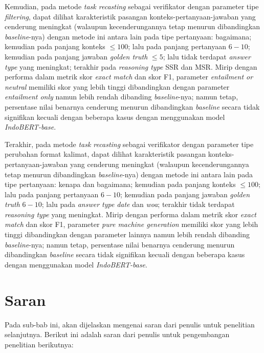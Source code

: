 \begin{enumerate}
 Kemudian, pada metode \emph{task recasting} sebagai verifikator dengan parameter tipe \emph{filtering}, dapat dilihat karakteristik pasangan konteks-pertanyaan-jawaban yang cenderung meningkat (walaupun kecenderungannya tetap menurun dibandingkan \emph{baseline}-nya) dengan metode ini antara lain pada tipe pertanyaan: bagaimana; kemudian pada panjang konteks $\leq100$; lalu pada panjang pertanyaan $6-10$; kemudian pada panjang jawaban \emph{golden truth} $\leq5$; lalu tidak terdapat \emph{answer type} yang meningkat; terakhir pada \emph{reasoning type} SSR dan MSR. Mirip dengan performa dalam metrik skor \emph{exact match} dan skor F1, parameter \emph{entailment or neutral} memiliki skor yang lebih tinggi dibandingkan dengan parameter \emph{entailment only} namun lebih rendah dibanding \emph{baseline}-nya; namun tetap, persentase nilai benarnya cenderung menurun dibandingkan \emph{baseline} secara tidak signifikan kecuali dengan beberapa kasus dengan menggunakan model \emph{IndoBERT-base}. 

 Terakhir, pada metode \emph{task recasting} sebagai verifikator dengan parameter tipe perubahan format kalimat, dapat dilihat karakteristik pasangan konteks-pertanyaan-jawaban yang cenderung meningkat (walaupun kecenderungannya tetap menurun dibandingkan \emph{baseline}-nya) dengan metode ini antara lain pada tipe pertanyaan: kenapa dan bagaimana; kemudian pada panjang konteks $\leq100$; lalu pada panjang pertanyaan $6-10$; kemudian pada panjang jawaban \emph{golden truth} $6-10$; lalu pada \emph{answer type} \emph{date} dan \emph{woa}; terakhir tidak terdapat \emph{reasoning type} yang meningkat. Mirip dengan performa dalam metrik skor \emph{exact match} dan skor F1, parameter \emph{pure machine generation} memiliki skor yang lebih tinggi dibandingkan dengan parameter lainnya namun lebih rendah dibanding \emph{baseline}-nya; namun tetap, persentase nilai benarnya cenderung menurun dibandingkan \emph{baseline} secara tidak signifikan kecuali dengan beberapa kasus dengan menggunakan model \emph{IndoBERT-base}. 

\end{enumerate}

\section{Saran}
\label{6.2}
Pada sub-bab ini, akan dijelaskan mengenai saran dari penulis untuk penelitian selanjutnya. Berikut ini adalah saran dari penulis untuk pengembangan penelitian berikutnya:

